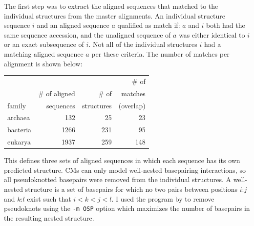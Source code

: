 The first step was to extract the aligned sequences that matched to
the individual structures from the master alignments.  An individual
structure sequence $i$ and an aligned sequence $a$ qualified as match
if: $a$ and $i$ both had the same sequence accession, and the
unaligned sequence of $a$ was either identical to $i$ or an exact
subsequence of $i$.  Not all of the individual structures $i$ had a
matching aligned sequence $a$ per these criteria.  The number of
matches per alignment is shown below:

\begin{center}
\begin{tabular}{l|r|r|r}
             &               &            & \# of   \\ 
             & \# of aligned & \# of      & matches  \\ 
family       & sequences     & structures & (overlap) \\ \hline%
archaea      &           132 &         25 &  23      \\%
bacteria     &          1266 &        231 &  95      \\%
eukarya      &          1937 &        259 & 148      \\%
\end{tabular}
\end{center}

This defines three sets of aligned sequences in which each sequence 
has its own predicted structure. CMs can only model well-nested
basepairing interactions, so all pseudoknotted basepairs
were removed from the individual structures. A well-nested structure
is a set of basepairs for which no two pairs between positions $i$:$j$
and $k$:$l$ exist such that $i<k<j<l$. I used the program
 by \cite{Smit08} to remove
pseudoknots using the \texttt{-m OSP} option which maximizes the number
of basepairs in the resulting nested structure.


